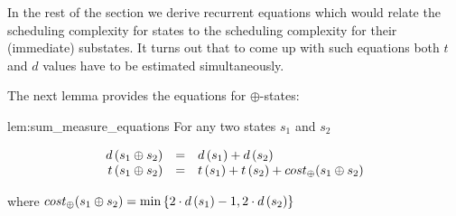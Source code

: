 \begin{comment}
In the rest of the section we state a number of lemmas providing estimations for these two values. The proofs for the lemmas (when omitted) can be
found in Appendix~\ref{sec:appendix}.

The first lemma provides a fundamental relation between these two~--- $d$ and $t$,~--- estimations for the scheduling complexity:

\begin{lemma}
\label{lem:d_t_relation}
 $d\,(s) \le t\,(s) \le d^2\,(s)$ for any state $s$.
\end{lemma} }
{ \color{red}
\begin{proof}
  Follows immediately from the definitions of the estimated values and the fact that the height of a state increases by at most $1$ at each step.\qed
\end{proof}
}
\end{comment}

In the rest of the section we derive recurrent equations which would relate the scheduling complexity for states to the scheduling complexity for their
(immediate) substates. It turns out that to come up with such equations both $t$ and $d$ values have to be estimated simultaneously.  




The next lemma provides the equations for $\oplus$-states:

\begin{replemma}{lem:sum_measure_equations}
For any two states $s_1$ and $s_2$

\[
\begin{array}{rcl}
  d\,(s_1 \oplus s_2) &=& d\,(s_1) + d\,(s_2) \\
    t\,(s_1 \oplus s_2) &=& t\,(s_1) + t\,(s_2) + cost_{\oplus}(s_1 \oplus s_2)
\end{array}
\]

where $cost_{\oplus}(s_1 \oplus s_2) = \min\,\{2\cdot d\,(s_1) - 1, 2\cdot d\,(s_2)\}$
\end{replemma}

